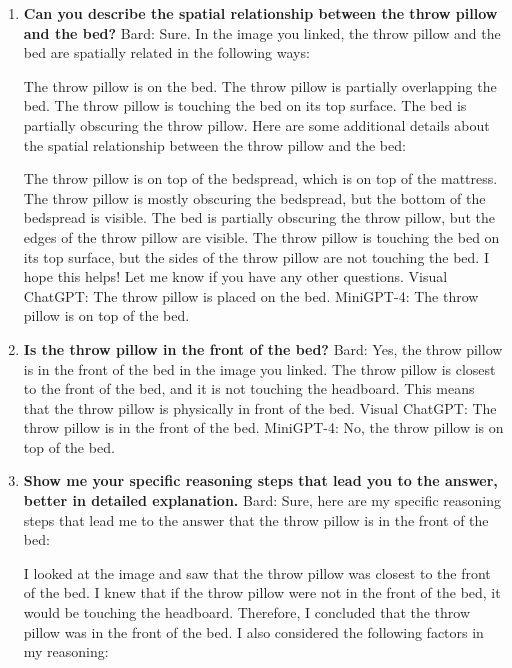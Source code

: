     \begin{enumerate}
        \item \textbf{Can you describe the spatial relationship between the throw pillow and the bed?}
        \subitem Bard:
        Sure. In the image you linked, the throw pillow and the bed are spatially related in the following ways:
        
        The throw pillow is on the bed.
        The throw pillow is partially overlapping the bed.
        The throw pillow is touching the bed on its top surface.
        The bed is partially obscuring the throw pillow.
        Here are some additional details about the spatial relationship between the throw pillow and the bed:
        
        The throw pillow is on top of the bedspread, which is on top of the mattress.
        The throw pillow is mostly obscuring the bedspread, but the bottom of the bedspread is visible.
        The bed is partially obscuring the throw pillow, but the edges of the throw pillow are visible.
        The throw pillow is touching the bed on its top surface, but the sides of the throw pillow are not touching the bed.
        I hope this helps! Let me know if you have any other questions.
        \subitem Visual ChatGPT: The throw pillow is placed on the bed.
        \subitem MiniGPT-4: The throw pillow is on top of the bed.
        \item \textbf{Is the throw pillow in the front of the bed?} 
        \subitem Bard: 
        Yes, the throw pillow is in the front of the bed in the image you linked. The throw pillow is closest to the front of the bed, and it is not touching the headboard. This means that the throw pillow is physically in front of the bed. 
        \subitem Visual ChatGPT: The throw pillow is in the front of the bed.
        \subitem MiniGPT-4: No, the throw pillow is on top of the bed.
        \item \textbf{Show me your specific reasoning steps that lead you to the answer, better in detailed explanation.}
        \subitem Bard: Sure, here are my specific reasoning steps that lead me to the answer that the throw pillow is in the front of the bed:

        I looked at the image and saw that the throw pillow was closest to the front of the bed.
        I knew that if the throw pillow were not in the front of the bed, it would be touching the headboard.
        Therefore, I concluded that the throw pillow was in the front of the bed.
        I also considered the following factors in my reasoning:
        

\end{enumerate}
